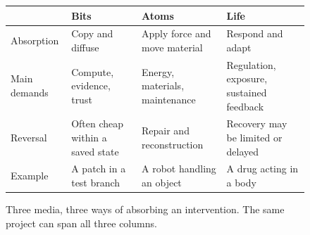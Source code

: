 \begin{figure}[ht]
\centering
\begin{tabularx}{\textwidth}{@{}lXXX@{}}
\toprule
 & \textbf{Bits} & \textbf{Atoms} & \textbf{Life}\\
\midrule
Absorption & Copy and diffuse & Apply force and move material & Respond and adapt\\
Main demands & Compute, evidence, trust & Energy, materials, maintenance & Regulation, exposure, sustained feedback\\
Reversal & Often cheap within a saved state & Repair and reconstruction & Recovery may be limited or delayed\\
Example & A patch in a test branch & A robot handling an object & A drug acting in a body\\
\bottomrule
\end{tabularx}
\caption{Three media, three ways of absorbing an intervention. The same project can span all three columns.}
\label{fig:media-gradient}
\end{figure}

